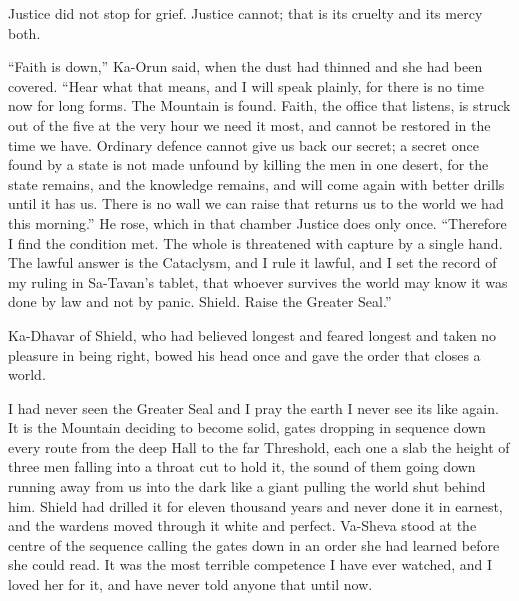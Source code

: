\ornament

Justice did not stop for grief. Justice cannot; that is its cruelty and its mercy both.\par

``Faith is down,'' Ka-Orun said, when the dust had thinned and she had been covered. ``Hear what that means, and I will speak plainly, for there is no time now for long forms. The Mountain is found. Faith, the office that listens, is struck out of the five at the very hour we need it most, and cannot be restored in the time we have. Ordinary defence cannot give us back our secret; a secret once found by a state is not made unfound by killing the men in one desert, for the state remains, and the knowledge remains, and will come again with better drills until it has us. There is no wall we can raise that returns us to the world we had this morning.'' He rose, which in that chamber Justice does only once. ``Therefore I find the condition met. The whole is threatened with capture by a single hand. The lawful answer is the Cataclysm, and I rule it lawful, and I set the record of my ruling in Sa-Tavan's tablet, that whoever survives the world may know it was done by law and not by panic. Shield. Raise the Greater Seal.''\par

Ka-Dhavar of Shield, who had believed longest and feared longest and taken no pleasure in being right, bowed his head once and gave the order that closes a world.\par

\ornament

I had never seen the Greater Seal and I pray the earth I never see its like again. It is the Mountain deciding to become solid, gates dropping in sequence down every route from the deep Hall to the far Threshold, each one a slab the height of three men falling into a throat cut to hold it, the sound of them going down running away from us into the dark like a giant pulling the world shut behind him. Shield had drilled it for eleven thousand years and never done it in earnest, and the wardens moved through it white and perfect. Va-Sheva stood at the centre of the sequence calling the gates down in an order she had learned before she could read. It was the most terrible competence I have ever watched, and I loved her for it, and have never told anyone that until now.\par

